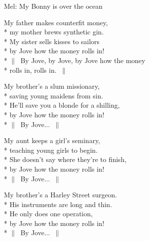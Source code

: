 \begin{SongText}
    \begin{SongInfo}
        Mel: My Bonny is over the ocean
    \end{SongInfo}
    \begin{SongVerse}
        My father makes counterfit money,\\*%
        my mother brews synthetic gin.\\*%
        My sister sells kisses to sailors\\*%
        by Jove how the money rolls in!\\*%
        $\|\:$ By Jove, by Jove, by Jove how the money\\*%
        rolls in, rolls in. $\:\|$
    \end{SongVerse}
    \begin{SongVerse}
        My brother’s a slum missionary,\\*%
        saving young maidens from sin.\\*%
        He’ll save you a blonde for a shilling,\\*%
        by Jove how the money rolls in!\\*%
        $\|\:$ By Jove... $\:\|$
    \end{SongVerse}
    \begin{SongVerse}
        My aunt keeps a girl’s seminary,\\*%
        teaching young girls to begin.\\*%
        She doesn’t say where they’re to finish,\\*%
        by Jove how the money rolls in!\\*%
        $\|\:$ By Jove... $\:\|$
    \end{SongVerse}
    \begin{SongVerse}
        My brother’s a Harley Street surgeon.\\*%
        His instruments are long and thin.\\*%
        He only does one operation,\\*%
        by Jove how the money rolls in!\\*%
        $\|\:$ By Jove... $\:\|$
    \end{SongVerse}
\end{SongText}
